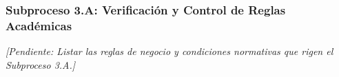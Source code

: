 \subsubsection{Subproceso 3.A: Verificación y Control de Reglas Académicas}

\textit{[Pendiente: Listar las reglas de negocio y condiciones normativas que rigen el Subproceso 3.A.]}

